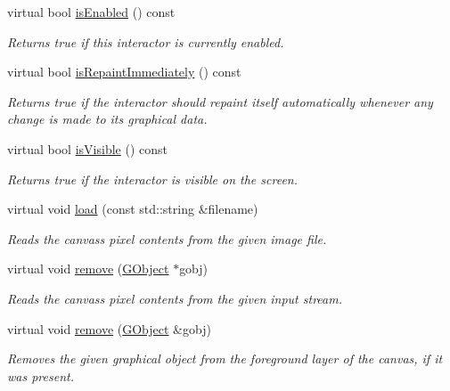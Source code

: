 \begin{DoxyCompactItemize}
virtual bool \mbox{\hyperlink{classsgl_1_1GInteractor_aacb819fb241851fd9fc045271baa4034}{is\+Enabled}} () const
\begin{DoxyCompactList}\small\item\em Returns true if this interactor is currently enabled. \end{DoxyCompactList}\item 
virtual bool \mbox{\hyperlink{classsgl_1_1GDrawingSurface_a82a00267c81cc0ae85ee0feb01a92fa8}{is\+Repaint\+Immediately}} () const
\begin{DoxyCompactList}\small\item\em Returns true if the interactor should repaint itself automatically whenever any change is made to its graphical data. \end{DoxyCompactList}\item 
virtual bool \mbox{\hyperlink{classsgl_1_1GInteractor_a9d8a6cfb13917785c143e74d40e4e2be}{is\+Visible}} () const
\begin{DoxyCompactList}\small\item\em Returns true if the interactor is visible on the screen. \end{DoxyCompactList}\item 
virtual void \mbox{\hyperlink{classsgl_1_1GCanvas_a6c21edd9d285c925527e3209fca54b01}{load}} (const std\+::string \&filename)
\begin{DoxyCompactList}\small\item\em Reads the canvas\textquotesingle{}s pixel contents from the given image file. \end{DoxyCompactList}\item 
virtual void \mbox{\hyperlink{classsgl_1_1GCanvas_a49dc57a2ce4caa354a5fff6acdde2e7d}{remove}} (\mbox{\hyperlink{classsgl_1_1GObject}{G\+Object}} $\ast$gobj)
\begin{DoxyCompactList}\small\item\em Reads the canvas\textquotesingle{}s pixel contents from the given input stream. \end{DoxyCompactList}\item 
virtual void \mbox{\hyperlink{classsgl_1_1GCanvas_a0c0ae4d69b584602ff3cba0d9cf330a4}{remove}} (\mbox{\hyperlink{classsgl_1_1GObject}{G\+Object}} \&gobj)
\begin{DoxyCompactList}\small\item\em Removes the given graphical object from the foreground layer of the canvas, if it was present. \end{DoxyCompactList}\item 

\end{DoxyCompactItemize}
